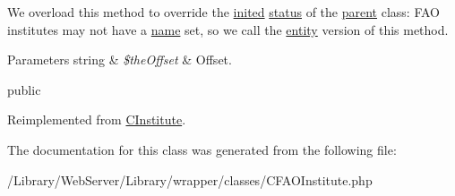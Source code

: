 We overload this method to override the \hyperlink{class_c_status_object_a8429102e4f52f7558649b64f4e673a69}{inited} \hyperlink{}{status} of the \hyperlink{class_c_institute}{parent} class\-: F\-A\-O institutes may not have a \hyperlink{class_c_entity_ace5878c009baf09d85c8ca115c48dbb0}{name} set, so we call the \hyperlink{class_c_entity}{entity} version of this method.


\begin{DoxyParams}[1]{Parameters}
string & {\em \$the\-Offset} & Offset.\\
\hline
\end{DoxyParams}
public 

Reimplemented from \hyperlink{class_c_institute_a8f82ded3b52a6fb609c67e45669e1454}{C\-Institute}.



The documentation for this class was generated from the following file\-:\begin{DoxyCompactItemize}
\item 
/\-Library/\-Web\-Server/\-Library/wrapper/classes/C\-F\-A\-O\-Institute.\-php\end{DoxyCompactItemize}
